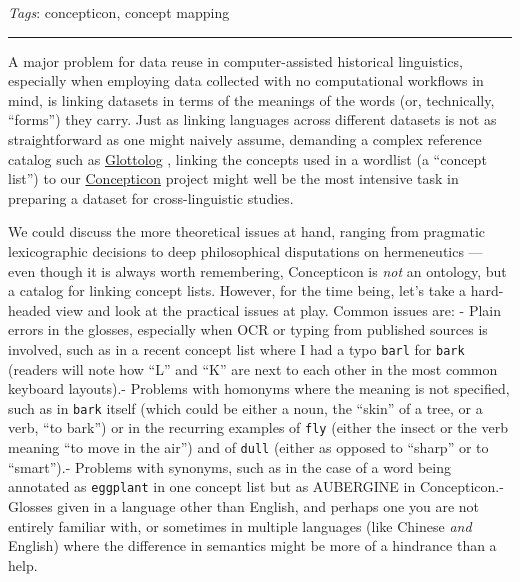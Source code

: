 \documentclass[
  a4paper,
  14pt,
  oneside,
  tablecaptionabove
]{scrbook}
\newcommand{\passthrough}[1]{#1}
\begin{document}
\emph{Tags}: concepticon, concept mapping

\begin{center}\rule{0.5\linewidth}{1pt}\end{center}

A major problem for data reuse in computer-assisted historical
linguistics, especially when employing data collected with no
computational workflows in mind, is linking datasets in terms of the
meanings of the words (or, technically, \enquote{forms}) they carry.
Just as linking languages across different datasets is not as
straightforward as one might naively assume, demanding a complex
reference catalog such as \href{https://glottolog.org/}{Glottolog} ,
linking the concepts used in a wordlist (a \enquote{concept list}) to
our \href{https://concepticon.clld.org/}{Concepticon} project might well
be the most intensive task in preparing a dataset for cross-linguistic
studies.

We could discuss the more theoretical issues at hand, ranging from
pragmatic lexicographic decisions to deep philosophical disputations on
hermeneutics --- even though it is always worth remembering, Concepticon
is \emph{not} an ontology, but a catalog for linking concept lists.
However, for the time being, let's take a hard-headed view and look at
the practical issues at play. Common issues are: - Plain errors in the
glosses, especially when OCR or typing from published sources is
involved, such as in a recent concept list where I had a typo
\passthrough{\lstinline!barl!} for \passthrough{\lstinline!bark!}
(readers will note how \enquote{L} and \enquote{K} are next to each
other in the most common keyboard layouts).- Problems with homonyms
where the meaning is not specified, such as in
\passthrough{\lstinline!bark!} itself (which could be either a noun, the
\enquote{skin} of a tree, or a verb, \enquote{to bark}) or in the
recurring examples of \passthrough{\lstinline!fly!} (either the insect
or the verb meaning \enquote{to move in the air}) and of
\passthrough{\lstinline!dull!} (either as opposed to \enquote{sharp} or
to \enquote{smart}).- Problems with synonyms, such as in the case of a
word being annotated as \passthrough{\lstinline!eggplant!} in one
concept list but as AUBERGINE in Concepticon.- Glosses given in a
language other than English, and perhaps one you are not entirely
familiar with, or sometimes in multiple languages (like Chinese
\emph{and} English) where the difference in semantics might be more of a
hindrance than a help.
\end{document}
